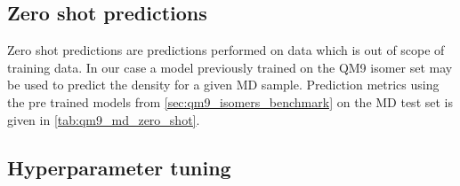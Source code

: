 \subsection{Zero shot predictions}
\label{sec:qm9_md_isomers_zero_shot}
Zero shot predictions are predictions performed on data which is out of scope of training data. In our case a model previously trained on the QM9  isomer set may be used to predict the density for a given MD sample. Prediction metrics using the pre trained models from \autoref{sec:qm9_isomers_benchmark} on the MD test set is given in \autoref{tab:qm9_md_zero_shot}. 
\begin{table}[h]
    \centering
    \caption[GNN zero shot predictions on QM9 isomers MD]{GNN zero shot predictions on the QM9 isomer MD test set. $\text{GNN}_\text{initial}$ and $\text{GNN}_\text{f. 0}$ were trained using the QM9 isomer set.}
    \label{tab:qm9_md_zero_shot}
\end{table}

\subsection{Hyperparameter tuning}
\label{sec:qm9_md_isomers_hyp_tuning}

